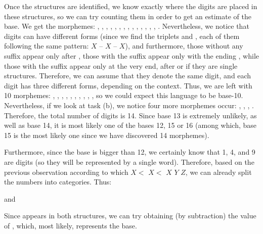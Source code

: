 \begin{refsection}
\begin{mysolution}
Once the structures are identified, we know exactly where the digits are placed in these structures, so we can try counting them in order to get an estimate of the base. We get the morphemes: , , , , , , , , , , , , , , . Nevertheless, we notice that digits can have different forms (since we find the triplets  and , each of them following the same pattern: $X$ – $X$ -- $X$), and furthermore, those without any suffix appear only after , those with the suffix  appear only with the ending , while those with the suffix  appear only at the very end, after  or if they are single structures. Therefore, we can assume that they denote the same digit, and each digit has three different forms, depending on the context. Thus, we are left with 10 morphemes: , , , , , , , , , , so we could expect this language to be base-10. Nevertheless, if we look at task (b), we notice four more morphemes occur: , , , . Therefore, the total number of digits is 14. Since base 13 is extremely unlikely, as well as base 14, it is most likely one of the bases 12, 15 or 16 (among which, base 15 is the most likely one since we have discovered 14 morphemes).

Furthermore, since the base is bigger than 12, we certainly know that 1, 4, and 9 are digits (so they will be represented by a single word). Therefore, based on the previous observation according to which $X <$  $X <$  $X$ $Y$ $Z$, we can already split the numbers into categories. Thus:

and

Since  appears in both structures, we can try obtaining (by subtraction) the value of , which, most likely, represents the base.


\end{mysolution}
\end{refsection}
